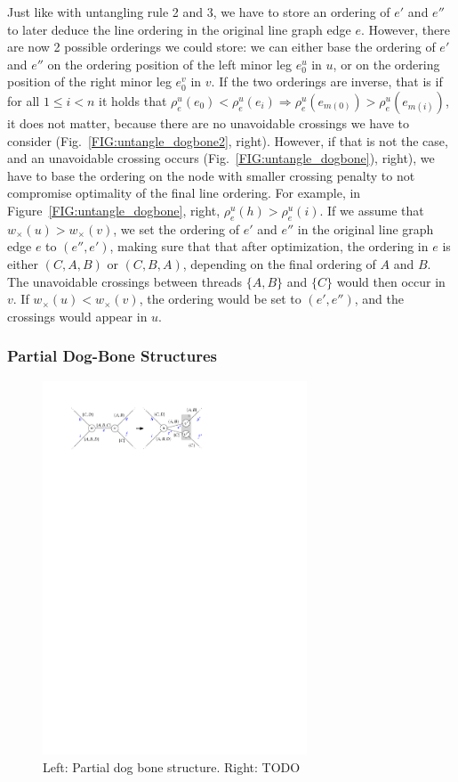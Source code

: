 \documentclass[format=acmsmall, review=false, screen=true]{acmart}
\begin{document}
Just like with untangling rule 2 and 3, we have to store an ordering of $e'$ and $e''$ to later deduce the line ordering in the original line graph edge $e$. However, there are now 2 possible orderings we could store: we can either base the ordering of $e'$ and $e''$ on the ordering position of the left minor leg $e^u_0$ in $u$, or on the ordering position of the right minor leg $e^v_0$ in $v$. If the two orderings are inverse, that is if for all $1 \leq i < n$ it holds that $\rho^u_e(e_0) < \rho^u_e(e_i) \Rightarrow \rho^u_e(e_{m(0)}) > \rho^u_e(e_{m(i)})$, it does not matter, because there are no unavoidable crossings we have to consider (Fig.~\ref{FIG:untangle_dogbone2}, right). However, if that is not the case, and an unavoidable crossing occurs (Fig.~\ref{FIG:untangle_dogbone}), right), we have to base the ordering on the node with smaller crossing penalty to not compromise optimality of the final line ordering. For example, in Figure~\ref{FIG:untangle_dogbone}, right, $\rho^u_e(h) > \rho^u_e(i)$. If we assume that $w_\times(u) > w_\times(v)$, we set the ordering of $e'$ and $e''$ in the original line graph edge $e$ to $(e'', e')$, making sure that that after optimization, the ordering in $e$ is either $(C, A, B)$ or $(C, B, A)$, depending on the final ordering of $A$ and $B$. The unavoidable crossings between threads $\{A, B\}$ and $\{C\}$ would then occur in $v$. If $w_\times(u) < w_\times(v)$, the ordering would be set to $(e', e'')$, and the crossings would appear in $u$.

\subsubsection{Partial Dog-Bone Structures}

\begin{figure}
  \includegraphics[width=0.7\textwidth, page=1]{untangling/dogbone_partial.pdf}
  \caption{Left: Partial dog bone structure. Right: TODO}  
  \label{FIG:untangle_dogbone_partial}
\end{figure}
\end{document}

